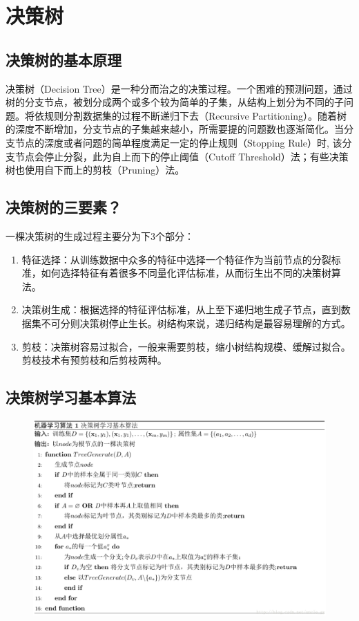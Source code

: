 \section{决策树}

\subsection{决策树的基本原理}

决策树（Decision Tree）是一种分而治之的决策过程。一个困难的预测问题，通过树的分支节点，被划分成两个或多个较为简单的子集，从结构上划分为不同的子问题。将依规则分割数据集的过程不断递归下去（Recursive Partitioning）。随着树的深度不断增加，分支节点的子集越来越小，所需要提的问题数也逐渐简化。当分支节点的深度或者问题的简单程度满足一定的停止规则（Stopping Rule）时, 该分支节点会停止分裂，此为自上而下的停止阈值（Cutoff Threshold）法；有些决策树也使用自下而上的剪枝（Pruning）法。

\subsection{决策树的三要素？}

一棵决策树的生成过程主要分为下3个部分：  

\begin{enumerate}\itemsep0em 
		\item 特征选择：从训练数据中众多的特征中选择一个特征作为当前节点的分裂标准，如何选择特征有着很多不同量化评估标准，从而衍生出不同的决策树算法。 
		\item 决策树生成：根据选择的特征评估标准，从上至下递归地生成子节点，直到数据集不可分则决策树停止生长。树结构来说，递归结构是最容易理解的方式。 
		\item 剪枝：决策树容易过拟合，一般来需要剪枝，缩小树结构规模、缓解过拟合。剪枝技术有预剪枝和后剪枝两种。
\end{enumerate}

\subsection{决策树学习基本算法}

 \begin{figure}[h]
   \centering
   \includegraphics[width=.7\textwidth]{imgs/2-5.eps}
 \end{figure}

